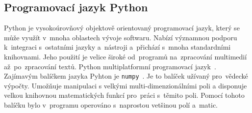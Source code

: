 



% 








\subsection{Programovací jazyk Python} \label{sec:python}
  Python je vysokoúrovňový objektově orientovaný programovací jazyk, který se může využít v~mnoha oblastech vývoje softwaru. Nabízí významnou podporu k~integraci s~ostatními jazyky a~nástroji a~přichází s~mnoha standardními knihovnami. Jeho použití je velice široké od~programů na~zpracování multimedií až~po~zpracování textů. Python multiplatformní programovací jazyk~\citep{python}. Zajímavým balíčkem jazyka Pyhton je {\tt numpy}~\citep{numpy}. Je to balíček užívaný pro~vědecké výpočty. Umožňuje manipulaci s velkými multi-dimenzionálními poli a disponuje velkou knihovnou matematických funkcí pro~práci s~těmito poli. Pomocí tohoto balíčku bylo v~programu operováno s~naprostou vetšinou polí a~matic. 
  
